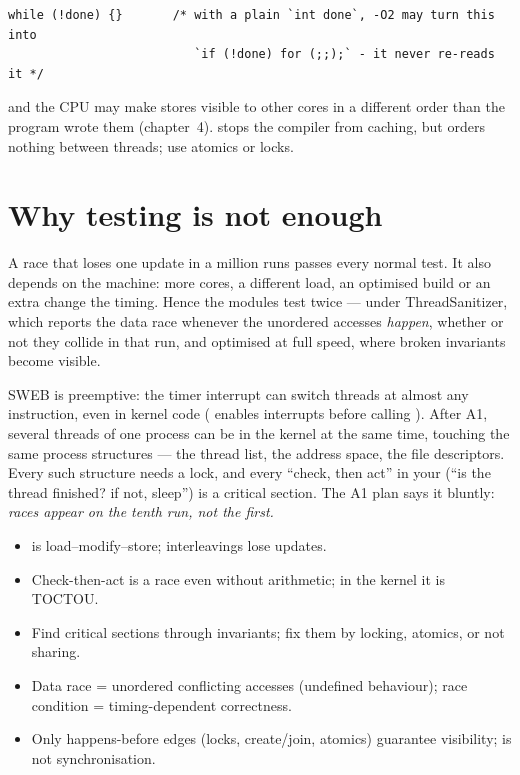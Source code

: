 \begin{lstlisting}
while (!done) {}       /* with a plain `int done`, -O2 may turn this into
                          `if (!done) for (;;);` - it never re-reads it */
\end{lstlisting}

and the CPU may make stores visible to other cores in a different order
than the program wrote them (chapter~4).  stops the
compiler from caching, but orders nothing between threads; use atomics or
locks.

\section{Why testing is not enough}

A race that loses one update in a million runs passes every normal test.
It also depends on the machine: more cores, a different load, an
optimised build or an extra  change the timing. Hence the
modules test twice --- under ThreadSanitizer, which reports the data race
whenever the unordered accesses \emph{happen}, whether or not they
collide in that run, and optimised at full speed, where broken invariants
become visible.

\begin{swebbox}
SWEB is preemptive: the timer interrupt can switch threads at almost any
instruction, even in kernel code ( enables
interrupts before calling ). After A1,
several threads of one process can be in the kernel at the same time,
touching the same process structures --- the thread list, the address
space, the file descriptors. Every such structure needs a lock, and every
``check, then act'' in your  (``is the thread
finished? if not, sleep'') is a critical section. The A1 plan says it
bluntly: \emph{races appear on the tenth run, not the first.}
\end{swebbox}

\begin{keybox}
\begin{itemize}
  \item {} is load--modify--store; interleavings lose updates.
  \item Check-then-act is a race even without arithmetic; in the kernel
    it is TOCTOU.
  \item Find critical sections through invariants; fix them by locking,
    atomics, or not sharing.
  \item Data race = unordered conflicting accesses (undefined behaviour);
    race condition = timing-dependent correctness.
  \item Only happens-before edges (locks, create/join, atomics) guarantee
    visibility;  is not synchronisation.
\end{itemize}
\end{keybox}
